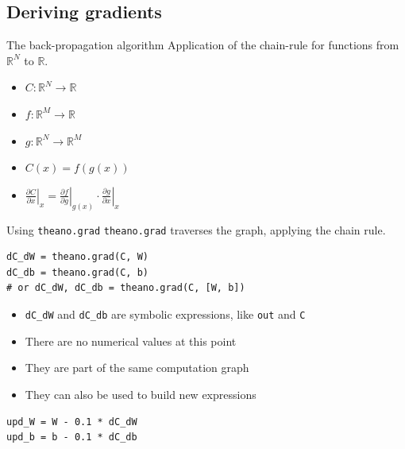 \documentclass[a4paper,9pt]{beamer}
\begin{document}
\subsection{Deriving gradients}
\begin{frame}{The back-propagation algorithm}
  Application of the chain-rule for functions from ${\mathbb R}^N$ to ${\mathbb R}$.
  \begin{itemize}
    \item $C: {\mathbb R}^N \rightarrow {\mathbb R}$
    \item $f: {\mathbb R}^M \rightarrow {\mathbb R}$
    \item $g: {\mathbb R}^N \rightarrow {\mathbb R}^M$
    \item $C(x) = f(g(x))$
    \item $\left.\frac{\partial C}{\partial x}\right|_x =
              \left.\frac{\partial f}{\partial g}\right|_{g(x)}
              \cdot \left.\frac{\partial g}{\partial x}\right|_x$
  \end{itemize}


\end{frame}

\begin{frame}[fragile]{Using \texttt{theano.grad}}
\verb|theano.grad| traverses the graph, applying the chain rule.
  \begin{verbatim}
dC_dW = theano.grad(C, W)
dC_db = theano.grad(C, b)
# or dC_dW, dC_db = theano.grad(C, [W, b])
  \end{verbatim}
  \begin{itemize}
    \item \verb|dC_dW| and \verb|dC_db| are symbolic expressions, like \verb|out| and \verb|C|
    \item There are no numerical values at this point
    \item They are part of the same computation graph
    \item They can also be used to build new expressions
  \end{itemize}
  \begin{verbatim}
upd_W = W - 0.1 * dC_dW
upd_b = b - 0.1 * dC_db
  \end{verbatim}
\end{frame}
\end{document}
